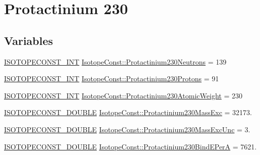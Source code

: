 \hypertarget{group___isotope_const-_protactinium-_pa230}{}\section{Protactinium 230}
\label{group___isotope_const-_protactinium-_pa230}
\subsection*{Variables}
\begin{DoxyCompactItemize}
\item 
\mbox{\hyperlink{group___isotope_const-_macros_ga5f18360b3e99483a35c32d789e62621c}{I\+S\+O\+T\+O\+P\+E\+C\+O\+N\+S\+T\+\_\+\+I\+NT}} \mbox{\hyperlink{group___isotope_const-_protactinium-_pa230_ga01cb16ddaee92fb45916810faf99d9c9}{Isotope\+Const\+::\+Protactinium230\+Neutrons}} = 139
\item 
\mbox{\hyperlink{group___isotope_const-_macros_ga5f18360b3e99483a35c32d789e62621c}{I\+S\+O\+T\+O\+P\+E\+C\+O\+N\+S\+T\+\_\+\+I\+NT}} \mbox{\hyperlink{group___isotope_const-_protactinium-_pa230_gac0e75eae56ec3d78be78ab759043a00c}{Isotope\+Const\+::\+Protactinium230\+Protons}} = 91
\item 
\mbox{\hyperlink{group___isotope_const-_macros_ga5f18360b3e99483a35c32d789e62621c}{I\+S\+O\+T\+O\+P\+E\+C\+O\+N\+S\+T\+\_\+\+I\+NT}} \mbox{\hyperlink{group___isotope_const-_protactinium-_pa230_ga94650b18a9ee808793854e3b451869ad}{Isotope\+Const\+::\+Protactinium230\+Atomic\+Weight}} = 230
\item 
\mbox{\hyperlink{group___isotope_const-_macros_ga8f45a7272ce02c0b4c65c44636ed719a}{I\+S\+O\+T\+O\+P\+E\+C\+O\+N\+S\+T\+\_\+\+D\+O\+U\+B\+LE}} \mbox{\hyperlink{group___isotope_const-_protactinium-_pa230_ga52dd11b1f4d611fd7f66fb3ea651b941}{Isotope\+Const\+::\+Protactinium230\+Mass\+Exc}} = 32173.
\item 
\mbox{\hyperlink{group___isotope_const-_macros_ga8f45a7272ce02c0b4c65c44636ed719a}{I\+S\+O\+T\+O\+P\+E\+C\+O\+N\+S\+T\+\_\+\+D\+O\+U\+B\+LE}} \mbox{\hyperlink{group___isotope_const-_protactinium-_pa230_ga864cce7f05af9bf8b1bafdeccaa68cd4}{Isotope\+Const\+::\+Protactinium230\+Mass\+Exc\+Unc}} = 3.
\item 
\mbox{\hyperlink{group___isotope_const-_macros_ga8f45a7272ce02c0b4c65c44636ed719a}{I\+S\+O\+T\+O\+P\+E\+C\+O\+N\+S\+T\+\_\+\+D\+O\+U\+B\+LE}} \mbox{\hyperlink{group___isotope_const-_protactinium-_pa230_ga0e7e209c311350228ec5ce519c084af5}{Isotope\+Const\+::\+Protactinium230\+Bind\+E\+PerA}} = 7621.

\end{DoxyCompactItemize}
